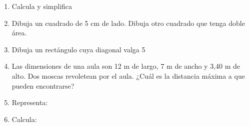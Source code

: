 \documentclass[10pt,letter,twoside]{article}
\begin{document}
\begin{multicols}{2}
\begin{enumerate}
\begin{enumerate}
\end{enumerate}
\item Calcula y simplifica
\begin{enumerate}
\end{enumerate}
\item Dibuja un cuadrado de 5 cm de lado. Dibuja otro cuadrado que tenga doble área.
\item Dibuja un rectángulo cuya diagonal valga 5
\item Las dimensiones de una aula son 12 m de largo, 7 m de ancho y 3,40 m de alto. Dos moscas revoletean por el aula. ¿Cuál es la distancia máxima a que pueden encontrarse?
\item Representa:
\begin{enumerate}
\end{enumerate}
  \item Calcula:
  \begin{enumerate}
\end{enumerate}
\end{enumerate}
\end{multicols}
\end{document}
